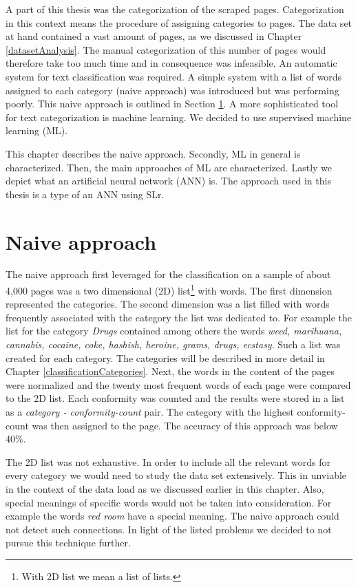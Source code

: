 \label{classification}
A part of this thesis was the categorization of the scraped pages. Categorization in this context means the procedure of assigning categories to pages. The data set at hand contained a vast amount of pages, as we discussed in Chapter \ref{datasetAnalysis}. The manual categorization of this number of pages would therefore take too much time and in consequence was infeasible. An automatic system for text classification was required. A simple system with a list of words assigned to each category (naive approach) was introduced but was performing poorly. This naive approach is outlined in Section \ref{naiveApproach}. A more sophisticated tool for text categorization is machine learning. We decided to use supervised machine learning (ML).

This chapter describes the naive approach. Secondly, ML in general is characterized. Then, the main approaches of ML are characterized. Lastly we depict what an artificial neural network (ANN) is. The approach used in this thesis is a type of an ANN using SLr.


 \section{Naive approach} \label{naiveApproach}
The naive approach first leveraged for the classification on a sample of about 4,000 pages was a two dimensional (2D) list\footnote{With 2D list we mean a list of lists.} with words. The first dimension represented the categories. The second dimension was a list filled with words frequently associated with the category the list was dedicated to. For example the list for the category \textit{Drugs} contained among others the words \textit{weed, marihuana, cannabis, cocaine, coke, hashish, heroine, grams, drugs, ecstasy}. Such a list was created for each category. The categories will be described in more detail in Chapter \ref{classificationCategories}. Next, the words in the content of the pages were normalized and the twenty most frequent words of each page were compared to the 2D list. Each conformity was counted and the results were stored in a list as a \textit{category - conformity-count} pair. The category with the highest conformity-count was then assigned to the page. The accuracy of this approach was below 40\%.

The 2D list was not exhaustive. In order to include all the relevant words for every category we would need to study the data set extensively. This in unviable in the context of the data load as we discussed earlier in this chapter. Also, special meanings of specific words would not be taken into consideration. For example the words \textit{red room} have a special meaning. The naive approach could not detect such connections. In light of the listed problems we decided to not pursue this technique further.


